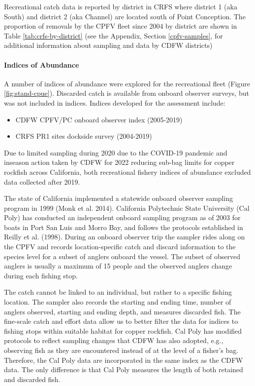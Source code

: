 \documentclass[11pt,
  english,
  letterpaper,
]{article}
\providecommand{\tightlist}{%
  \setlength{\itemsep}{0pt}\setlength{\parskip}{0pt}}
\providecommand{\tightlist}{%
  \setlength{\itemsep}{0pt}\setlength{\parskip}{0pt}}
\begin{document}
Recreational catch data is reported by district in CRFS where district 1 (aka South) and district 2 (aka Channel) are located south of Point Conception. The proportion of removals by the CPFV fleet since 2004 by district are shown in Table \ref{tab:crfs-by-district} (see the Appendix, Section \ref{cpfv-samples}, for additional information about sampling and data by CDFW districts)

\hypertarget{indices-of-abundance}{%
\paragraph{Indices of Abundance}\label{indices-of-abundance}}

\hfill\break

A number of indices of abundance were explored for the recreational fleet (Figure \ref{fig:stand-cpue}). Discarded catch is available from onboard observer surveys, but was not included in indices. Indices developed for the assessment include:

\begin{itemize}
\tightlist
\item
  CDFW CPFV/PC onboard observer index (2005-2019)
\item
  CRFS PR1 sites dockside survey (2004-2019)
\end{itemize}

Due to limited sampling during 2020 due to the COVID-19 pandemic and inseason action taken by CDFW for 2022 reducing sub-bag limits for copper rockfish across California, both recreational fishery indices of abundance excluded data collected after 2019.

The state of California implemented a statewide onboard observer sampling program in 1999 (Monk et al. 2014). California Polytechnic State University (Cal Poly) has conducted an independent onboard sampling program as of 2003 for boats in Port San Luis and Morro Bay, and follows the protocols established in Reilly et al. (1998). During an onboard observer trip the sampler rides along on the CPFV and records location-specific catch and discard information to the species level for a subset of anglers onboard the vessel. The subset of observed anglers is usually a maximum of 15 people and the observed anglers change during each fishing stop.

The catch cannot be linked to an individual, but rather to a specific fishing location. The sampler also records the starting and ending time, number of anglers observed, starting and ending depth, and measures discarded fish. The fine-scale catch and effort data allow us to better filter the data for indices to fishing stops within suitable habitat for copper rockfish. Cal Poly has modified protocols to reflect sampling changes that CDFW has also adopted, e.g., observing fish as they are encountered instead of at the level of a fisher's bag. Therefore, the Cal Poly data are incorporated in the same index as the CDFW data. The only difference is that Cal Poly measures the length of both retained and discarded fish.
\end{document}
